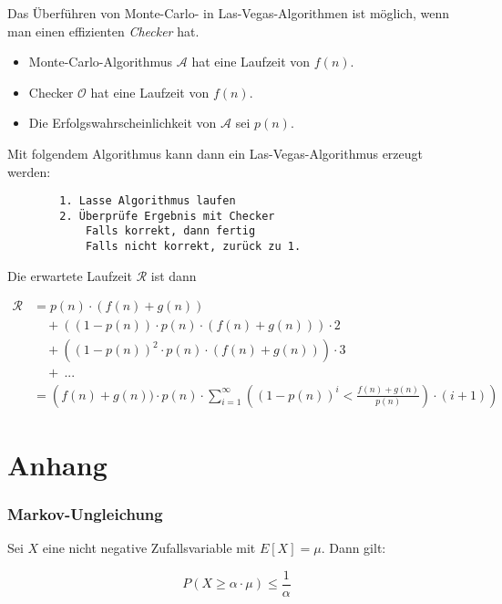 \documentclass{scrartcl}%
\begin{document}
    Das Überführen von Monte-Carlo- in Las-Vegas-Algorithmen ist möglich, wenn man einen effizienten \textit{Checker} hat.

    \begin{itemize}
        \item Monte-Carlo-Algorithmus $\mathcal{A}$ hat eine Laufzeit von $f(n)$.
        \item Checker $\mathcal{O}$ hat eine Laufzeit von $f(n)$.
        \item Die Erfolgswahrscheinlichkeit von $\mathcal{A}$ sei $p(n)$.
    \end{itemize}

    Mit folgendem Algorithmus kann dann ein Las-Vegas-Algorithmus erzeugt werden:

    \begin{lstlisting}
        1. Lasse Algorithmus laufen
        2. Überprüfe Ergebnis mit Checker
            Falls korrekt, dann fertig
            Falls nicht korrekt, zurück zu 1.
    \end{lstlisting}

    Die erwartete Laufzeit $\mathcal{R}$ ist dann

    \begin{equation*}
        \begin{flalign}
            \mathcal{R} &= p(n) \cdot (f(n) + g(n))&&\\\nonumber
            &\quad + ((1 - p(n)) \cdot p(n) \cdot (f(n) + g(n))) \cdot 2&&\\\nonumber
            &\quad + ((1 - p(n))^2 \cdot p(n) \cdot (f(n) + g(n))) \cdot 3&&\\\nonumber
            &\quad +\ ...&&\\\nonumber
            &=\left( f(n) + g(n)) \cdot p(n) \cdot \sum^{\infty}_{i=1}((1-p(n))^i < \frac{f(n) + g(n)}{p(n)}) \cdot (i+1)\right)
        \end{flalign}
    \end{equation*}

    \hrulefill

    \section*{Anhang}
    \label{sec:anhang}

    \subsubsection*{Markov-Ungleichung}
    Sei $X$ eine nicht negative Zufallsvariable mit $E[X] = \mu$.
    Dann gilt:

    \begin{equation*}
        P(X \geq \alpha \cdot \mu ) \leq \frac{1}{\alpha}
    \end{equation*}
\end{document}
